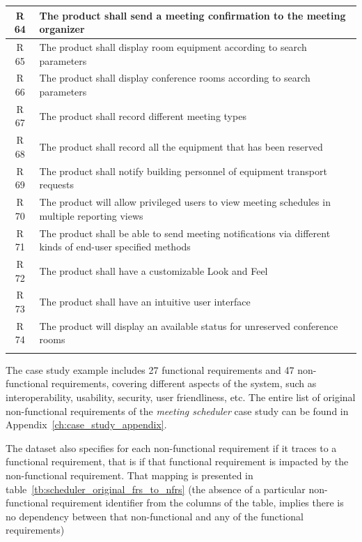 \documentclass[dissertation,final]{softeng}
\newcommand{\nfrs}{non-functional requirements\xspace}
\begin{document}
{\begin{table}[h!]
{\begin{tabularx}{\textwidth}{cX}
    R 64  & The product shall send a meeting confirmation to the meeting organizer \\ \midrule
    R 65  & The product shall display room equipment according to search parameters \\ \midrule
    R 66  & The product shall display conference rooms according to search parameters \\ \midrule
    R 67  & The product shall record different meeting types \\ \midrule
    R 68  & The product shall record all the equipment that has been reserved \\ \midrule
    R 69  & The product shall notify building personnel of equipment transport requests \\ \midrule
    R 70  & The product will allow privileged users to view meeting schedules in multiple reporting views \\ \midrule
    R 71  & The product shall be able to send meeting notifications via different kinds of end-user specified methods \\ \midrule
    R 72  & The product shall have a customizable Look and Feel \\ \midrule
    R 73  & The product shall have an intuitive user interface \\ \midrule
    R 74  & The product will display an available status for unreserved conference rooms \\
    \addlinespace
    \bottomrule
    \end{tabularx}
}
\end{table}
}

The case study example includes 27 functional requirements and 47 \nfrs, covering different aspects of the system, such as interoperability, usability, security, user friendliness, etc. The entire list of original non-functional requirements of the \emph{meeting scheduler} case study can be found in Appendix~\ref{ch:case_study_appendix}. 

The dataset also specifies for each non-functional requirement if it traces to a functional requirement, that is if that functional requirement is impacted by the non-functional requirement. That mapping is presented in table~\ref{tb:scheduler_original_frs_to_nfrs} (the absence of a particular non-functional requirement identifier from the columns of the table, implies there is no dependency between that non-functional and any of the functional requirements)
\end{document}

